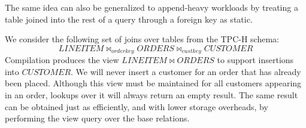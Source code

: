 The same idea can also be generalized to append-heavy workloads by treating a table joined into the rest of a query through a foreign key as static.  

\begin{example}
We consider the following set of joins over tables from the TPC-H\cite{counciltpc} schema:
$$LINEITEM \bowtie_{orderkey} ORDERS \bowtie_{custkey} CUSTOMER$$
Compilation produces the view $LINEITEM \bowtie ORDERS$ to support insertions into $CUSTOMER$.  We will never insert a customer for an order that has already been placed.  Although this view must be maintained for all customers appearing in an order, lookups over it will always return an empty result.  The same result can be obtained just as efficiently, and with lower storage overheads, by performing the view query over the base relations. 
\end{example}
